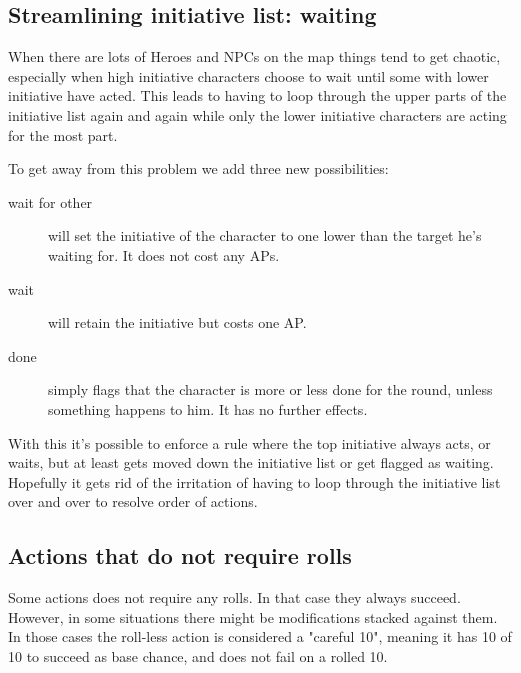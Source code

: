 

\subsection*{Streamlining initiative list: waiting}
When there are lots of Heroes and NPCs on the map things tend to get chaotic, especially when high initiative characters choose to wait until some with lower initiative have acted. This leads to having to loop through the upper parts of the initiative list again and again while only the lower initiative characters are acting for the most part.

To get away from this problem we add three new possibilities:\\
\begin{description}
\item[wait for other] will set the initiative of the character to one lower than the target he's waiting for. It does not cost any APs.
\item[wait] will retain the initiative but costs one AP.
\item[done] simply flags that the character is more or less done for the round, unless something happens to him. It has no further effects.
\end{description}

With this it's possible to enforce a rule where the top initiative always acts, or waits, but at least gets moved down the initiative list or get flagged as waiting. Hopefully it gets rid of the irritation of having to loop through the initiative list over and over to resolve order of actions.


\subsection*{Actions that do not require rolls}
Some actions does not require any rolls. In that case they always succeed. However, in some situations there might be modifications stacked against them. In those cases the roll-less action is considered a "careful 10", meaning it has 10 of 10 to succeed as base chance, and does not fail on a rolled 10.

